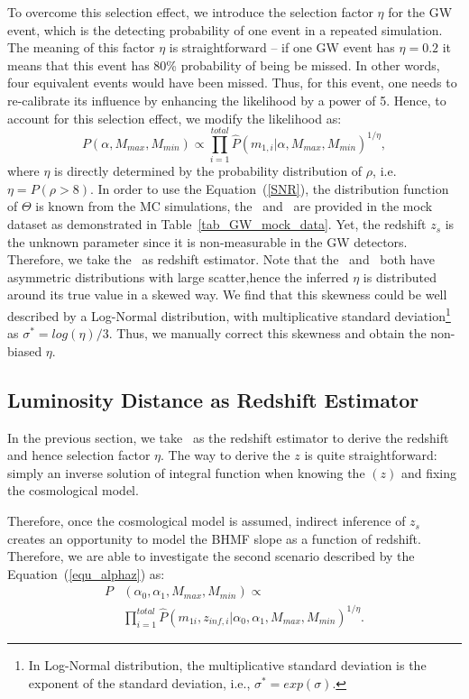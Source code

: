 \documentclass[twocolumn]{aastex62}
\begin{document}
To overcome this selection effect, we introduce the selection factor $\eta$ for the GW event, which is the detecting probability of one event in a repeated simulation. The meaning of this factor $\eta$ is straightforward -- if one GW event has $\eta=0.2$ it means that this event has 80\% probability of being be missed. In other words, four equivalent events would have been missed. Thus, for this event, one needs to re-calibrate its influence by  enhancing the likelihood by a power of 5. Hence, to account for this  selection effect, we modify the likelihood as:
 \begin{equation} \label{equ_lik_sf}
 P(\alpha, M_{max}, M_{min}) \propto  \prod_{i=1}^{total} \hat{P}(m_{1,i}|\alpha, M_{max}, M_{min})^{1/\eta},
 \end{equation}
where $\eta$ is directly determined by the probability distribution of $\rho$, i.e. $\eta = P(\rho>8)$. In order to use the Equation~(\ref{SNR}), the distribution function of $\Theta$ is known from the MC simulations, the \cmass\ and \dl\ are provided in the mock dataset as demonstrated in Table~\ref{tab_GW_mock_data}. Yet, the redshift $z_s$ is the unknown parameter since it is non-measurable in the GW detectors. Therefore, we take the \dl\ as redshift estimator.
Note that the \dl\ and \cmass\ both have asymmetric distributions with large scatter,hence the inferred $\eta$ is distributed around its true value in a skewed way. We find that this skewness could be well described by a Log-Normal distribution, with multiplicative standard deviation\footnote{In Log-Normal distribution, the multiplicative standard deviation is the exponent  of the standard deviation, i.e., $\sigma^* = exp(\sigma)$.} as $\sigma^*=log(\eta)/3$. Thus, we manually correct this skewness and obtain the non-biased $\eta$.

\subsection{Luminosity Distance as Redshift Estimator} 
\label{sec_dl_z}
In the previous section, we take \dl\ as the redshift estimator to derive the redshift and hence selection factor $\eta$. The way to derive the $z$ is quite straightforward: simply an inverse solution of integral function when knowing the \dl$(z)$ and fixing the cosmological model.

Therefore, once the cosmological model is assumed, indirect inference of $z_s$ creates an opportunity to model the BHMF slope as a function of redshift. Therefore, we are able to investigate the second scenario described by the Equation~(\ref{equ_alphaz}) as:
 \begin{equation} \label{equ_lik_alphaz}
 \begin{split}
 P&(\alpha_0, \alpha_1, M_{max}, M_{min}) \propto \\
  &\prod_{i=1}^{total} \hat{P}(m_{1i}, z_{inf,i} |\alpha_0, \alpha_1, M_{max}, M_{min})^{1/\eta}.
  \end{split}
 \end{equation}
 
\end{document}
